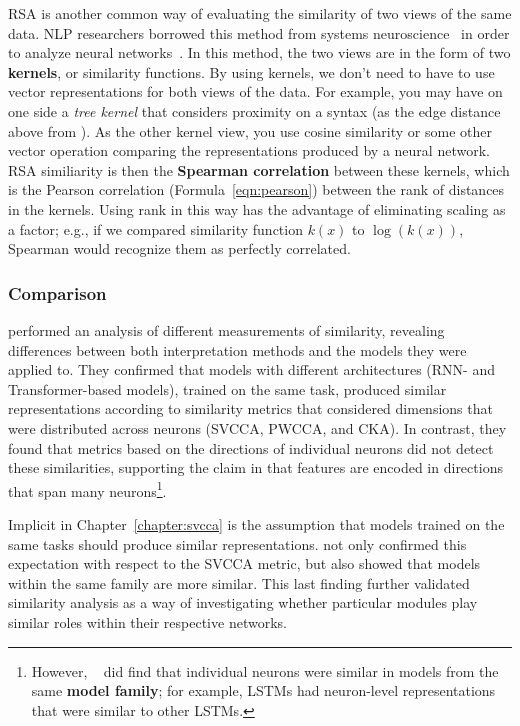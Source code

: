 RSA is another common way of evaluating the similarity of two views of the same data. NLP researchers borrowed this method from systems neuroscience~\citep{kriegeskorte_representational_2008} in order to analyze neural networks~\citep{chrupala_correlating_2019,chrupala_symbolic_2019,lepori_picking_2020}. In this method, the two views are in the form of two \textbf{kernels}, or similarity functions. By using kernels, we don't need to have to use vector representations for both views of the data. For example, you may have on one side a \textit{tree kernel} that considers proximity on a syntax (as the edge distance above from \citet{hewitt_designing_2019}). As the other kernel view, you use cosine similarity or some other vector operation comparing the representations produced by a neural network. RSA similiarity is then the \textbf{Spearman correlation} between these kernels, which is the Pearson correlation (Formula~\ref{eqn:pearson}) between the rank of distances in the kernels. Using rank in this way has the advantage of eliminating scaling as a factor; e.g., if we compared similarity function $k(x)$ to $\log(k(x))$, Spearman would recognize them as perfectly correlated.

\subsubsection{Comparison}

\citet{wu_similarity_2020} performed an analysis of different measurements of similarity, revealing differences between both interpretation methods and the models they were applied to. They confirmed that models with different architectures (RNN- and Transformer-based models), trained on the same task, produced similar representations according to similarity metrics that considered dimensions that were distributed across neurons (SVCCA, PWCCA, and CKA). In contrast, they found that metrics based on the directions of individual neurons did not detect these similarities, supporting the claim in \cite{morcos_importance_2018} that features are encoded in directions that span many neurons\footnote{However, ~\citet{wu_similarity_2020} did find that individual neurons were similar in models from the same \textbf{model family}; for example, LSTMs had neuron-level representations that were similar to other LSTMs.}.

Implicit in Chapter~\ref{chapter:svcca} is the assumption that models trained on the same tasks should produce similar representations. \citet{wu_similarity_2020} not only confirmed this expectation with respect to the SVCCA metric, but also showed that models within the same family are more similar. This last finding further validated similarity analysis as a way of investigating whether particular modules play similar roles within their respective networks.


